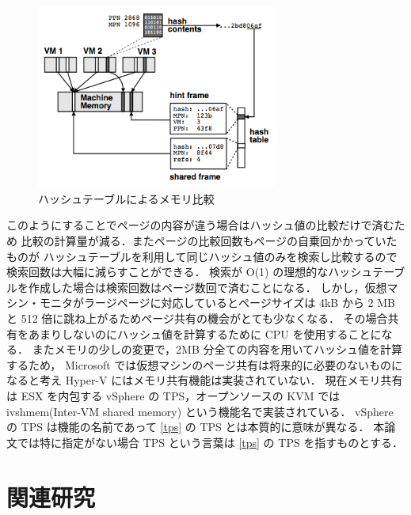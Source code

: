 \documentclass[graduation-thesis]{mlarticle}
\begin{document}
\begin{figure}[H]\begin{center}\includegraphics[width=8.0cm]{./img/hashtable.png}\caption{ ハッシュテーブルによるメモリ比較}\label{hashtable}\end{center}\end{figure}

このようにすることでページの内容が違う場合はハッシュ値の比較だけで済むため
比較の計算量が減る．またページの比較回数もページの自乗回かかっていたものが
ハッシュテーブルを利用して同じハッシュ値のみを検索し比較するので検索回数は大幅に減らすことができる．
検索が O(1) の理想的なハッシュテーブルを作成した場合は検索回数はページ数回で済むことになる．
しかし，仮想マシン・モニタがラージページに対応しているとページサイズは 4kB から
2 MB と 512 倍に跳ね上がるためページ共有の機会がとても少なくなる．
その場合共有をあまりしないのにハッシュ値を計算するために CPU を使用することになる．
またメモリの少しの変更で，2MB 分全ての内容を用いてハッシュ値を計算するため，
Microsoft では仮想マシンのページ共有は将来的に必要のないものになると考え
Hyper-V にはメモリ共有機能は実装されていない．
現在メモリ共有は ESX を内包する vSphere の TPS，オープンソースの KVM では
ivshmem(Inter-VM shared memory) という機能名で実装されている．
vSphere の TPS は機能の名前であって \ref{tps} の TPS とは本質的に意味が異なる．
本論文では特に指定がない場合 TPS という言葉は \ref{tps} の TPS を指すものとする．

\clearpage
\section{関連研究}
\label{sec-3}
\end{document}
